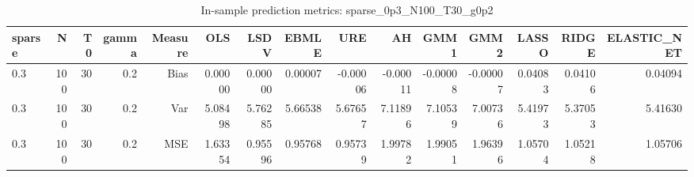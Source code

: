 \begin{table}[!htbp]\centering
\caption{In-sample prediction metrics: sparse_0p3_N100_T30_g0p2}
\label{tab:table2_sparse_0p3_N100_T30_g0p2}
\begin{tabular}{lrrrrrrrrrrrrrr}
\hline
sparse & N & T0 & gamma & Measure & OLS & LSDV & EBMLE & URE & AH & GMM1 & GMM2 & LASSO & RIDGE & ELASTIC_NET \\
\hline
0.3 & 100 & 30 & 0.2 & Bias & 0.00000 & 0.00000 & 0.00007 & -0.00006 & -0.00011 & -0.00008 & -0.00007 & 0.04083 & 0.04106 & 0.04094 \\
0.3 & 100 & 30 & 0.2 & Var & 5.08498 & 5.76285 & 5.66538 & 5.67657 & 7.11896 & 7.10539 & 7.00736 & 5.41973 & 5.37053 & 5.41630 \\
0.3 & 100 & 30 & 0.2 & MSE & 1.63354 & 0.95596 & 0.95768 & 0.95739 & 1.99782 & 1.99051 & 1.96396 & 1.05704 & 1.05218 & 1.05706 \\
\hline
\end{tabular}
\end{table}

